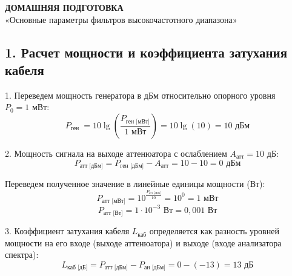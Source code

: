 \begin{center}
    \textbf{\LARGE ДОМАШНЯЯ ПОДГОТОВКА} \\[0.5cm]
    {\large «Основные параметры фильтров высокочастотного диапазона»}
\end{center}

\subsection*{1. Расчет мощности и коэффициента затухания кабеля}

1. Переведем мощность генератора в дБм относительно опорного уровня $P_0 = 1\text{ мВт}$:
$$P_{\text{ген }} = 10 \lg \left(\frac{P_{\text{ген [мВт]}}}{1\text{ мВт}}\right) = 10 \lg(10) = 10\text{ дБм}$$

2. Мощность сигнала на выходе аттенюатора с ослаблением $A_{\text{атт}} = 10\text{ дБ}$:
$$P_{\text{атт [дБм]}} = P_{\text{ген [дБм]}} - A_{\text{атт}} = 10 - 10 = 0\text{ дБм}$$

Переведем полученное значение в линейные единицы мощности (Вт):
$$P_{\text{атт [мВт]}} = 10^{\frac{P_{\text{атт [дБм]}}}{10}} = 10^{0} = 1\text{ мВт}$$
$$P_{\text{атт [Вт]}} = 1 \cdot 10^{-3}\text{ Вт} = 0{,}001\text{ Вт}$$

3. Коэффициент затухания кабеля $L_{\text{каб}}$ определяется как разность уровней мощности на его входе (выходе аттенюатора) и выходе (входе анализатора спектра):
$$L_{\text{каб [дБ]}} = P_{\text{атт [дБм]}} - P_{\text{ан [дБм]}} = 0 - (-13) = 13\text{ дБ}$$


